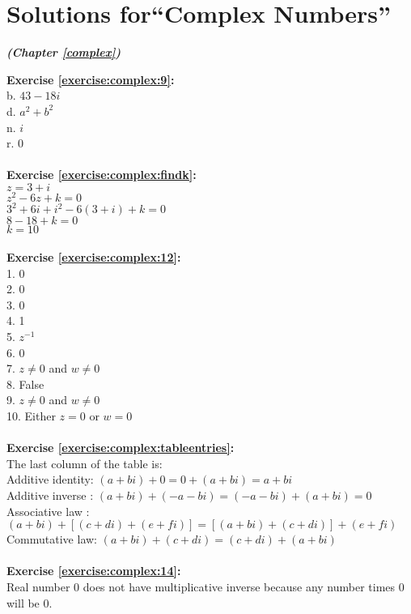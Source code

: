 \section{Solutions for``Complex Numbers''}
\noindent\textbf{\textit{ (Chapter \ref{complex})}}\bigskip

\noindent\textbf{Exercise \ref{exercise:complex:9}:} \\
b. $43-18i$\\
d. $a^2+b^2$\\
n. $i$\\
r. 0\\
\\
\noindent\textbf{Exercise \ref{exercise:complex:findk}:} \\
$z=3+i$\\
$z^{2}-6z+k=0$\\
$3^{2}+6i+i^{2}-6(3+i)+k=0$\\
$8-18+k=0$\\
$k=10$\\
\\
\textbf{Exercise \ref{exercise:complex:12}:}\\
1. 0\\
2. 0\\
3. 0\\
4. 1\\
5. $z^{-1}$\\
6. 0\\
7. $z \neq 0$ and $w \neq 0$ \\
8. False\\
9. $z \neq 0$ and $w \neq 0$ \\
10. Either $z=0$ or $w=0$\\
\\
\textbf{Exercise \ref{exercise:complex:tableentries}:}\\
The last column of the table is:\\
Additive identity: $(a+bi)+0=0+(a+bi)=a+bi$\\
Additive inverse : $(a+bi)+(-a-bi)=(-a-bi)+(a+bi)=0$\\
Associative law  : $(a+bi)+[(c+di)+(e+fi)]=[(a+bi)+(c+di)]+(e+fi)$\\
Commutative law: $(a+bi)+(c+di)=(c+di)+(a+bi)$\\
\\
\textbf{Exercise \ref{exercise:complex:14}:}\\
Real number 0 does not have multiplicative inverse because any number times 0 will be 0.\\
\\
